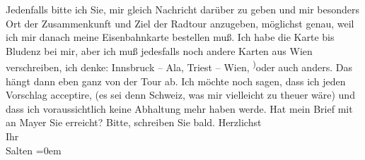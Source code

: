 \begin{ledgroupsized}[t]{13cm}
               Jedenfalls bitte ich Sie, mir gleich Nachricht darüber zu geben und mir besonders Ort
               der Zusammenkunft und Ziel der Radtour anzugeben, möglichst genau, weil ich mir
               danach meine Eisenbahnkarte bestellen muß. Ich habe die Karte bis Bludenz bei mir, aber ich muß jedesfalls noch andere Karten
               aus Wien verschreiben, ich denke: \strikeout{(}Innsbruck – Ala, Triest – Wien, \substVorne{}\textsuperscript{)}\substDazwischen{}o\substHinten{}der auch anders. Das hängt dann eben ganz von der Tour ab. {\pb}Ich möchte noch sagen, dass ich
               jeden Vorschlag acceptire, (es sei denn Schweiz, was mir vielleicht zu theuer wäre) und dass ich voraussichtlich keine
               Abhaltung mehr haben werde.\pend
           \pstart
           Hat mein Brief mit
               \label{K_L03310-2v}\label{K_L03310-2h} an Mayer Sie erreicht?\pend
           \pstart
           Bitte, schreiben Sie bald.\pend
           \pstart
           Herzlichst {\\[\baselineskip]}Ihr {\\[\baselineskip]}\spacefill\mbox{Salten}\pend
           \leftskip=0em{}
         
         \endnumbering{}\end{ledgroupsized}  \newcommand{\dateiname}{L03310}\newcommand{\titel}{Felix Salten an Arthur Schnitzler, 14. 8. 1900}\newcommand{\editorInnen}{Martin Anton Müller und Laura Untner}
      